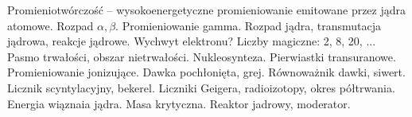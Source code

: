 Promieniotwórczość -- wysokoenergetyczne promieniowanie emitowane przez jądra atomowe.
Rozpad $\alpha, \beta$. Promieniowanie gamma.
Rozpad jądra, transmutacja jądrowa, reakcje jądrowe.
Wychwyt elektronu?
Liczby magiczne: 2, 8, 20, ...
Pasmo trwałości, obszar nietrwałości.
Nukleosynteza.
Pierwiastki transuranowe.
Promieniowanie jonizujące.
Dawka pochłonięta, grej. Równoważnik dawki, siwert. Licznik scyntylacyjny, bekerel.
Liczniki Geigera, radioizotopy, okres półtrwania.
Energia wiąznaia jądra. Masa krytyczna.
Reaktor jadrowy, moderator.